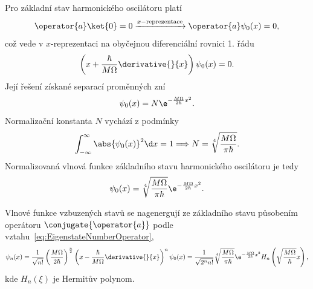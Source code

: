 \begin{solution}
\begin{enumerate}
        Pro základní stav harmonického oscilátoru platí
        \begin{equation}
            \operator{a}\ket{0}=0
            \xrightarrow{x-\text{reprezentace}}
            \operator{a}\psi_{0}(x)=0,
        \end{equation}
        což vede v $x$-reprezentaci na obyčejnou diferenciální rovnici 1. řádu
        \begin{equation}
            \left(x+\frac{\hbar}{M\Omega}\derivative{}{x}\right)\psi_{0}(x)=0.
        \end{equation}
        Její řešení získané separací proměnných zní
        \begin{equation}
            \psi_{0}(x)
                =N\e^{-\frac{M\Omega}{2\hbar}x^{2}}.
        \end{equation}
        Normalizační konstanta $N$ vychází z podmínky
        \begin{equation}
            \int_{-\infty}^{\infty}\abs{\psi_{0}(x)}^{2}\d x=1
            \Longrightarrow
            N=\sqrt[4]{\frac{M\Omega}{\pi\hbar}}.
        \end{equation}
        Normalizovaná vlnová funkce základního stavu harmonického oscilátoru je tedy
        \begin{equation}
			\label{eq:HOWaveFunctionGroundState}
            \psi_{0}(x)
                =\sqrt[4]{\frac{M\Omega}{\pi\hbar}}\e^{-\frac{M\Omega}{2\hbar}x^{2}}.
        \end{equation}

        Vlnové funkce vzbuzených stavů se nagenergují ze základního stavu působením operátoru $\conjugate{\operator{a}}$ podle vztahu~\eqref{eq:EigenstateNumberOperator},
        \begin{align}
            \psi_{n}(x)
                =\frac{1}{\sqrt{n!}}\left(\frac{M\Omega}{2\hbar}\right)^{\frac{n}{2}}\left(x-\frac{\hbar}{M\Omega}\derivative{}{x}\right)^{n}\psi_{0}(x)
                =\frac{1}{\sqrt{2^{n}n!}}\sqrt[4]{\frac{M\Omega}{\pi\hbar}}\e^{-\frac{M\Omega}{2\hbar}x^{2}}H_{n}\left(\sqrt{\frac{M\Omega}{\hbar}}x\right),
        \end{align}
        kde $H_{n}(\xi)$ je Hermitův polynom.
    \end{enumerate}    
\end{solution}	

